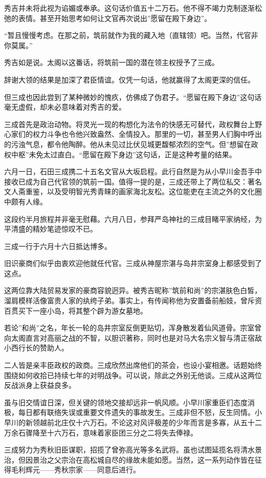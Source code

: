 \documentclass[
]{article}
\begin{document}
秀吉并未将此视为谄媚或奉承。这句话价值五十二万石。他不得不竭力克制逐渐松弛的表情。甚至开始思考如何让文官再次说出''愿留在殿下身边''。

``暂且慢慢考虑。在那之前，筑前就作为我的藏入地（直辖领）吧。当然，代官非你莫属。''

秀吉如是说。太阁以这番话，将筑前一国的潜在领主权授予了三成。

辞谢大领的结果是加深了君臣情谊。仅凭一句话，他就赢得了太阁更深的信任。

但三成也因此尝到了某种微妙的愧疚，仿佛成了伪君子。``愿留在殿下身边''这句话毫无虚假，却未必意味着对秀吉的爱。

三成首先是政治动物。将灵光一现的构想化为法令的快感无可替代，政权舞台上野心家们的权力斗争也令他兴致盎然、全情投入。那里的一切，甚至男人们胸中呼出的污浊气息，都令他陶醉。他从未见过比伏见城更馥郁浓烈的空气。但''想留在政权中枢''未免太过直白。``愿留在殿下身边''这句话，正是这种考量的结果。

六月一日，石田三成携二十五名文官从大坂启程。此行自然是为从小早川金吾手中接收已成为自己代官领的筑前一国。值得一提的是，三成还带上了两位私交：著名文人斋重鉴，以及受明智光秀青睐的画家海北友松。这位能吏在主流之外的文化圈中颇有人缘。

这段约半月旅程并非毫无慰藉。六月八日，参拜严岛神社的三成目睹平家纳经，为平清盛的精妙笔迹惊叹不已。

三成一行于六月十六日抵达博多。

旧识豪商们似乎由衷欢迎他就任代官。三成从神屋宗湛与岛井宗室身上都感受到了这点。

这两位靠大陆贸易发家的豪商容貌迥异。被秀吉昵称''筑前和尚''的宗湛肤色白皙，溜肩模样活像富贵人家的纨绔子弟。事实上，有传闻称他为安置备前船妓，曾斥资百贯买下一座小岛，将其整个辟为游女墓地。

若论''和尚''之名，年长一轮的岛井宗室反倒更贴切，浑身散发着仙风道骨。宗室曾向太阁直言对高丽之战的不智，以胆识著称，同时也是对马大名宗义智与清正宿敌小西行长的赞助人。

二人皆是亲丰臣政权的政商。三成欣然出席他们的茶会，也设小宴相邀。话题始终围绕如何收拾已持续七年的对明战争。可以说，除此之外别无他谈。三成从这两位反战派身上获益良多。

虽与旧交情谊日深，但关键的领地交接却远非一帆风顺。小早川家重臣们态度消极，每日都有联络失误或重要文件遗失的事故发生。三成非但不怒，反生同情。小早川的新领越前北庄仅十六万石。不论这对风评极差的少年而言是多寡，从五十二万余石骤降至十六万石，意味着家臣团三分之二将失去俸禄。

三成努力为秀秋旧臣谋职，招揽了曾弥高光等多名武将。虽也试图延揽名将清水景治，但因景治之父宗治在高松城自尽的缘故未能如愿。当然，这一系列动作皆在征得毛利辉元------秀秋宗家------同意后进行。
\end{document}
